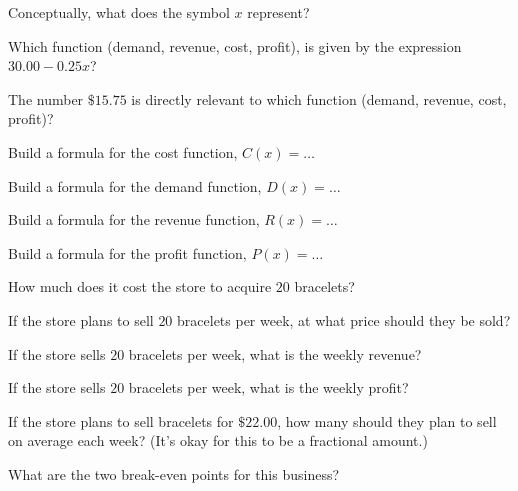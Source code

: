 \begin{ProblemSet}
 \begin{Problem}
  Conceptually, what does the symbol $x$ represent?
 \end{Problem}
 \begin{Problem}
  Which function (demand, revenue, cost, profit), is given by the expression $30.00 - 0.25 x$?
 \end{Problem}
 \begin{Problem}
  The number $\$15.75$ is directly relevant to which function (demand, revenue, cost, profit)?
 \end{Problem}
 \begin{Problem}
  Build a formula for the cost function, $C(x) = \dots$
 \end{Problem}
 \begin{Problem}
  Build a formula for the demand function, $D(x) = \dots$
 \end{Problem}
 \begin{Problem}
  Build a formula for the revenue function, $R(x) = \dots$
 \end{Problem}
 \begin{Problem}
  Build a formula for the profit function, $P(x) = \dots$
 \end{Problem}
 \begin{Problem}
  How much does it cost the store to acquire $20$ bracelets?
 \end{Problem}
 \begin{Problem}
  If the store plans to sell $20$ bracelets per week, at what price should they be sold?
 \end{Problem}
 \begin{Problem}
  If the store sells $20$ bracelets per week, what is the weekly revenue?
 \end{Problem}
 \begin{Problem}
  If the store sells $20$ bracelets per week, what is the weekly profit?
 \end{Problem}
 \begin{Problem}
  If the store plans to sell bracelets for $\$22.00$, how many should they plan to sell on average each week?
  (It's okay for this to be a fractional amount.)
 \end{Problem}
 \begin{Problem}
  What are the two break-even points for this business?
 \end{Problem}
\end{ProblemSet}

\newpage

